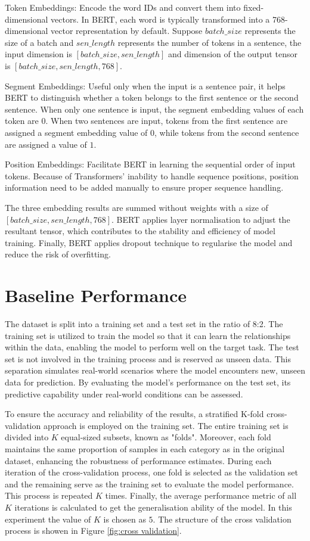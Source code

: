 \documentclass[ %
                    author={Louis Wang},
                supervisor={Dr. Qiang Liu},
                    degree={MSc},
                     title={Identification of Suicide Ideation in Texts},
                      type={},
                      year={2024}]{dissertation}
\begin{document}
Token Embeddings: Encode the word IDs and convert them into fixed-dimensional vectors. In BERT, each word is typically transformed into a 768-dimensional vector representation by default. Suppose $batch\_size$ represents the size of a batch and $sen\_length$ represents the number of tokens in a sentence, the input dimension is $[batch\_size, sen\_length]$ and dimension of the output tensor is $[batch\_size, sen\_length, 768]$.

Segment Embeddings: Useful only when the input is a sentence pair, it helps BERT to distinguish whether a token belongs to the first sentence or the second sentence. When only one sentence is input, the segment embedding values of each token are $0$. When two sentences are input, tokens from the first sentence are assigned a segment embedding value of $0$, while tokens from the second sentence are assigned a value of $1$.

Position Embeddings: Facilitate BERT in learning the sequential order of input tokens. Because of Transformers' inability to handle sequence positions, position information need to be added manually to ensure proper sequence handling.

The three embedding results are summed without weights with a size of $[batch\_size, sen\_length, 768]$. BERT applies layer normalisation to adjust the resultant tensor\cite{pymars2020normalisation}, which contributes to the stability and efficiency of model training. Finally, BERT applies dropout technique to regularise the model and reduce the risk of overfitting.

\section{Baseline Performance}
\noindent
The dataset is split into a training set and a test set in the ratio of 8:2. The training set is utilized to train the model so that it can learn the relationships within the data, enabling the model to perform well on the target task. The test set is not involved in the training process and is reserved as unseen data. This separation simulates real-world scenarios where the model encounters new, unseen data for prediction. By evaluating the model's performance on the test set, its predictive capability under real-world conditions can be assessed.

To ensure the accuracy and reliability of the results, a stratified K-fold cross-validation approach is employed on the training set\cite{browne2000cross}. The entire training set is divided into $K$ equal-sized subsets, known as "folds". Moreover, each fold maintains the same proportion of samples in each category as in the original dataset, enhancing the robustness of performance estimates. During each iteration of the cross-validation process, one fold is selected as the validation set and the remaining serve as the training set to evaluate the model performance. This process is repeated $K$ times. Finally, the average performance metric of all $K$ iterations is calculated to get the generalisation ability of the model. In this experiment the value of $K$ is chosen as $5$. The structure of the cross validation process is showen in Figure \ref{fig:cross validation}.
\end{document}
